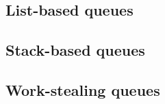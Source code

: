 \subsection{List-based queues}







\subsection{Stack-based queues}




\subsection{Work-stealing queues}
\label{sec:ws_queue}






